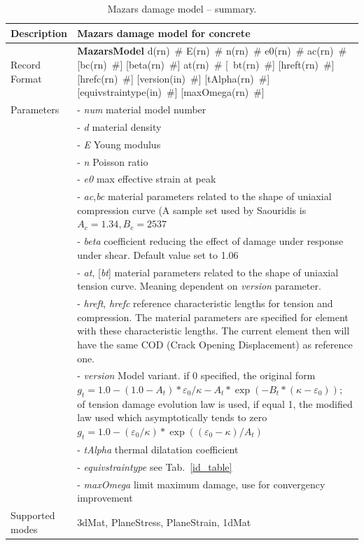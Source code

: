 \documentclass[a4paper]{article}
\newcommand{\descitem}[1]{{\noindent \bf #1}}
\newcommand{\elemparam}[2]{{{#1\tiny (#2)}~\#}}
\newcommand{\optelemparam}[2]{[{~\elemparam{#1}{#2}}]}
\newcommand{\param}[1]{{\it #1}}
\newcommand{\optparam}[1]{[{\it #1}]}
\newenvironment{mmt}{\begin{tabular}{|l|p{9cm}|}}{\end{tabular}\\}
\newenvironment{mmt}{\begin{tabular}{|l|l|}}{\end{tabular}\\}
\begin{document}
\begin{table}[!htb]
\begin{mmt}
\hline
Description & Mazars damage model for concrete\\
\hline
Record Format & \descitem{MazarsModel} \elemparam{d}{rn} \elemparam{E}{rn}
\elemparam{n}{rn}  \elemparam{e0}{rn}
\elemparam{ac}{rn} [\elemparam{bc}{rn}] [\elemparam{beta}{rn}]
\elemparam{at}{rn} \optelemparam{bt}{rn}
[\elemparam{hreft}{rn}] [\elemparam{hrefc}{rn}]
[\elemparam{version}{in}] [\elemparam{tAlpha}{rn}] [\elemparam{equivstraintype}{in}]
[\elemparam{maxOmega}{rn}]\\
Parameters &- \param{num} material model number\\
&- \param{d} material density\\
&- \param{E} Young modulus\\
&- \param{n} Poisson ratio\\
&- \param{e0} max effective strain at peak\\
&- \param{ac},\param{bc} material parameters related to the shape of
uniaxial compression curve (A sample set used by Saouridis is $A_c =
1.34, B_c = 2537$\\
&- \param{beta} coefficient reducing the effect of damage under
response under shear. Default value set to 1.06\\
&- \param{at}, \optparam{bt} material parameters related to the shape of
uniaxial tension curve. Meaning dependent on \param{version}
parameter.\\
&- \param{hreft}, \param{hrefc} reference characteristic lengths for
tension and compression. The material parameters are specified for
element with these characteristic lengths. The current element then
will have the same COD (Crack Opening Displacement) as reference one.\\
&- \param{version} Model variant. if 0 specified, the original form
$g_t= 1.0-(1.0-A_t)*\varepsilon_0/\kappa - A_t*\exp(-B_t*(\kappa-\varepsilon_0));
$ of
tension damage evolution law is used, if equal 1, the modified law
used which asymptotically tends to zero
$g_t = 1.0-(\varepsilon_0/\kappa)*\exp((\varepsilon_0-\kappa)/A_t)$\\
&- \param{tAlpha} thermal dilatation coefficient\\
&- \param{equivstraintype} see Tab.~\ref{id_table}\\
&- \param{maxOmega} limit maximum damage, use for convergency improvement\\
Supported modes& 3dMat, PlaneStress, PlaneStrain, 1dMat\\
\hline
\end{mmt}
\caption{Mazars damage model  -- summary.}
\label{maz_table}
\end{table}
\end{document}
